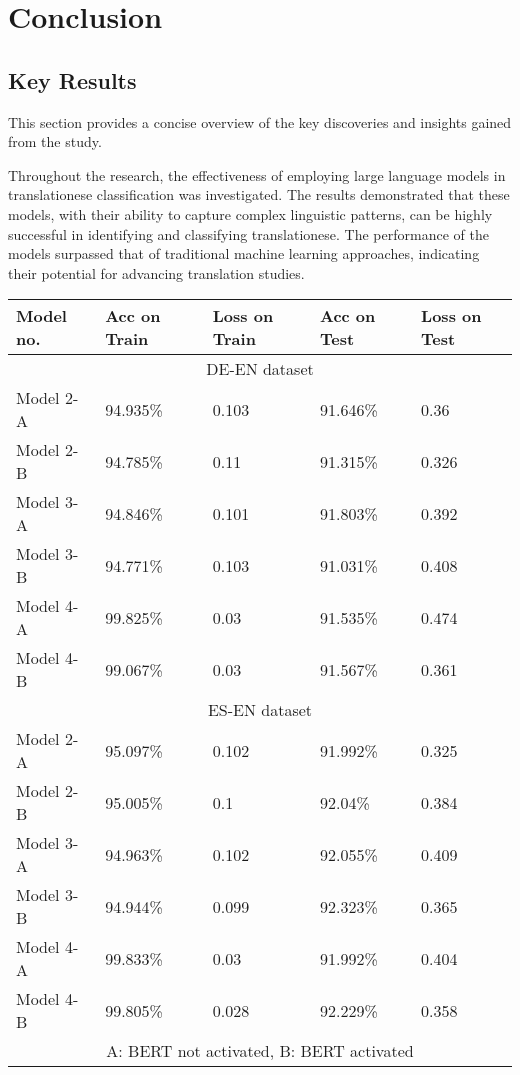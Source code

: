 \chapter{Conclusion}
\label{chap:conclusion}

\section{Key Results}

This section provides a concise overview of the key discoveries and insights gained from the study.

Throughout the research, the effectiveness of employing large language models in translationese classification was investigated. The results demonstrated that these models, with their ability to capture complex linguistic patterns, can be highly successful in identifying and classifying translationese. The performance of the models surpassed that of traditional machine learning approaches, indicating their potential for advancing translation studies.

\begin{center}
    \begin{tabular}{|p{2.5cm}||p{2.5cm}|p{2.5cm}|p{2.5cm}|p{2.5cm}|  }
     \hline
    Model no.	& Acc on Train	& Loss on Train & Acc on Test & Loss on Test\\
     \hline
     \multicolumn{5}{|c|}{DE-EN dataset} \\
     \hline
    Model 2-A&  94.935\%  &  0.103  &  91.646\%  &  0.36 \\
    Model 2-B&  94.785\%  &  0.11  &  91.315\%  &  0.326 \\
    Model 3-A&  94.846\%  &  0.101  &  91.803\%  &  0.392 \\
    Model 3-B&  94.771\%  &  0.103  &  91.031\%  &  0.408 \\
    Model 4-A&  99.825\%  &  0.03  &  91.535\%  &  0.474 \\
    Model 4-B&  99.067\%  &  0.03  &  91.567\%  &  0.361 \\
     \hline
     \multicolumn{5}{|c|}{ES-EN dataset} \\
     \hline
    Model 2-A&  95.097\%  &  0.102  &  91.992\%  &  0.325 \\
    Model 2-B&  95.005\%  &  0.1  &  92.04\%  &  0.384 \\
    Model 3-A&  94.963\%  &  0.102  &  92.055\%  &  0.409 \\
    Model 3-B&  94.944\%  &  0.099  &  92.323\%  &  0.365 \\
    Model 4-A&  99.833\%  &  0.03  &  91.992\%  &  0.404 \\
    Model 4-B&  99.805\%  &  0.028  &  92.229\%  &  0.358 \\
     \hline
     \multicolumn{5}{|c|}{A: BERT not activated, B: BERT activated} \\
     \hline
    \end{tabular}
\end{center}

